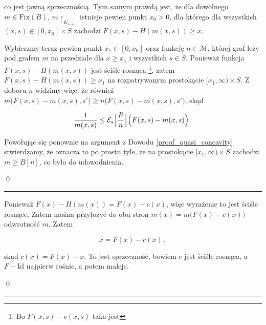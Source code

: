 co jest jawną sprzecznością. Tym samym prawdą jest, że dla dowolnego $m\in \mathrm{Fix}(B)$, $m\restriction_{K_{++}}$ istnieje pewien punkt $x_0 >0$, dla którego dla wszystkich $(x,s) \in [0, x_0]\times S$ zachodzi $F(x,s)- H(m(x,s)) \geq x$. 	
	
	Wybierzmy teraz pewien punkt $x_1 \in [0,x_0]$ oraz funkcję $n \in \mathcal{M}$, której graf leży pod grafem $m$ na przedziale dla $x \geq x_1$ i wszystkich $s\in S$. Ponieważ funkcja $F(x,s)-H(m(x,s))$ jest ściśle rosnąca \footnote{Bo $F(x,s)- c(x,s)$ taka jest}, zatem $F(x,s)-H(m(x,s))\geq x_1$ na rozpatrywanym prostokącie $[x_1, \infty) \times	S$. Z doboru $n$ widzimy więc, że również $m\bigl( F(x,s) - m(x,s), s' \bigl) \geq n\bigl( F(x,s) - m(x,s), s' \bigl)$, skąd
	
	$$ \frac{1}{m(x,s)} \leq \mathcal{E}_s \Bigl[ \frac{R}{n} \Bigl] \Bigl( F(x,s) - m(x,s)\Bigl)\,.$$
	
  Powołując się ponownie na argument z Dowodu \ref{proof_quasi_concavity} stwierdzamy, że oznacza to po prostu tyle, że na prostokącie $[x_1, \infty) \times S$ zachodzi $m \geq B[n]$, co było do udowodnienia.

\qed
\newline

\hrule
\begin{dowod}[Równanie $m(x) = m\big( F(x) - H(m(x)) \big)$ nie posiada rozwiązania w $B\brackets{\mathcal{M}\setminus\{ 0_{\mathcal{M}}\}}$]\label{proof_no_solution}
\end{dowod}

Ponieważ $F(x) - H(m(x)) = F(x) - c(x)$, więc wyrażenie to jest ściśle rosnące. Zatem można przyłożyć do obu stron $m(x) = m\big( F(x) - c(x) \big)$ odwrotność $m$. Zatem 

\begin{equation*}
	x = F(x) - c(x)\,,
\end{equation*}

skąd $c(x) = F(x) - x$. To jest sprzeczność, bowiem $c$ jest ściśle rosnąca, a $F - \mathrm{Id}$ najpierw rośnie, a potem maleje.

\qed
\newline



\hrule
\begin{dowod}\label{proof_diff_of_elements_of_M_with_C}
\end{dowod}

